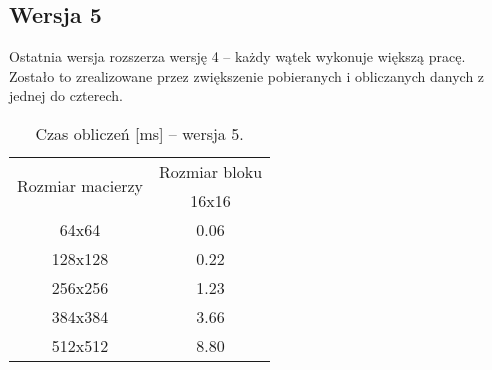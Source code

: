 
\subsection{Wersja 5}

Ostatnia wersja rozszerza wersję 4 -- każdy wątek wykonuje większą pracę. Zostało to zrealizowane przez zwiększenie pobieranych i obliczanych danych z jednej do czterech.



\begin{table}[H]
\centering
\begin{tabular}{|c|c|}
\hline
\multirow{2}{*}{Rozmiar macierzy} & \multicolumn{1}{c|}{Rozmiar bloku} \\ \cline{2-2}
& 16x16 \\ \hline
64x64 & 0.06 \\ \hline
128x128 & 0.22 \\ \hline
256x256 & 1.23 \\ \hline
384x384 & 3.66 \\ \hline
512x512 & 8.80 \\ \hline
\end{tabular}
\caption{Czas obliczeń [ms] -- wersja 5.}
\end{table}
